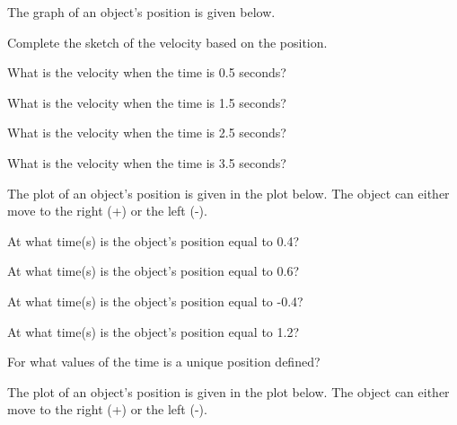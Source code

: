 \begin{problem}

\item The graph of an object's position is given below. 

  \begin{subproblem}
  \item Complete the sketch of the velocity based on the position.

    \scalebox{0.8}{}

    \item What is the velocity when the time is 0.5 seconds?
      \vspace{3em}

    \item What is the velocity when the time is 1.5 seconds?
      \vspace{3em}

    \item What is the velocity when the time is 2.5  seconds?
      \vspace{3em}

    \item What is the velocity when the time is 3.5 seconds?
      \vspace{3em}

    \clearpage

  \item The plot of an object's position is given in the plot
    below. The object can either move to the right (+) or the left
    (-).

    \scalebox{0.4}{}

    \begin{subproblem}
    \item At what time(s) is the object's position equal to 0.4?
      \vfill
    \item At what time(s) is the object's position equal to 0.6?
      \vfill
    \item At what time(s) is the object's position equal to -0.4?
      \vfill
    \item At what time(s) is the object's position equal to 1.2?
      \vfill
    \item For what values of the time is a unique position defined?
      \vfill
    \end{subproblem}

    \clearpage

  \item The plot of an object's position is given in the plot
    below. The object can either move to the right (+) or the left
    (-).


\end{subproblem}
\end{problem}
